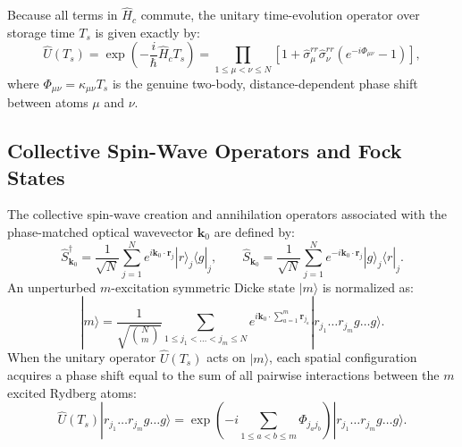 \documentclass[11pt,a4paper]{article}
\begin{document}
Because all terms in $\hat{H}_c$ commute, the unitary time-evolution operator over storage time $T_s$ is given exactly by:
\begin{equation}
    \hat{U}(T_s) = \exp\left(-\frac{i}{\hbar} \hat{H}_c T_s\right) = \prod_{1 \le \mu < \nu \le N} \left[ 1 + \hat{\sigma}_\mu^{rr}\hat{\sigma}_\nu^{rr} \left(e^{-i \Phi_{\mu\nu}} - 1\right) \right],
    \label{eq:U_exact}
\end{equation}
where $\Phi_{\mu\nu} = \kappa_{\mu\nu} T_s$ is the genuine two-body, distance-dependent phase shift between atoms $\mu$ and $\nu$.

\subsection{Collective Spin-Wave Operators and Fock States}
The collective spin-wave creation and annihilation operators associated with the phase-matched optical wavevector $\mathbf{k}_0$ are defined by:
\begin{equation}
    \hat{S}_{\mathbf{k}_0}^\dagger = \frac{1}{\sqrt{N}} \sum_{j=1}^N e^{i \mathbf{k}_0 \cdot \mathbf{r}_j} |r\rangle_j \langle g|_j, \qquad
    \hat{S}_{\mathbf{k}_0} = \frac{1}{\sqrt{N}} \sum_{j=1}^N e^{-i \mathbf{k}_0 \cdot \mathbf{r}_j} |g\rangle_j \langle r|_j.
    \label{eq:S_def}
\end{equation}
An unperturbed $m$-excitation symmetric Dicke state $|m\rangle$ is normalized as:
\begin{equation}
    |m\rangle = \frac{1}{\sqrt{\binom{N}{m}}} \sum_{1 \le j_1 < \dots < j_m \le N} e^{i \mathbf{k}_0 \cdot \sum_{a=1}^m \mathbf{r}_{j_a}} |r_{j_1} \dots r_{j_m} g \dots g\rangle.
    \label{eq:m_state}
\end{equation}
When the unitary operator $\hat{U}(T_s)$ acts on $|m\rangle$, each spatial configuration acquires a phase shift equal to the sum of all pairwise interactions between the $m$ excited Rydberg atoms:
\begin{equation}
    \hat{U}(T_s) |r_{j_1} \dots r_{j_m} g \dots g\rangle = \exp\left( -i \sum_{1 \le a < b \le m} \Phi_{j_a j_b} \right) |r_{j_1} \dots r_{j_m} g \dots g\rangle.
    \label{eq:U_on_state}
\end{equation}
\end{document}
